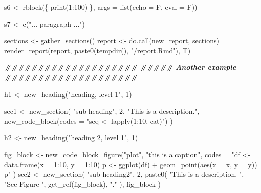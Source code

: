 \documentclass[
]{article}
\newenvironment{Shaded}{\begin{snugshade}}{\end{snugshade}}
\newcommand{\AttributeTok}[1]{\textcolor[rgb]{0.77,0.63,0.00}{#1}}
\newcommand{\DecValTok}[1]{\textcolor[rgb]{0.00,0.00,0.81}{#1}}
\newcommand{\DocumentationTok}[1]{\textcolor[rgb]{0.56,0.35,0.01}{\textbf{\textit{#1}}}}
\newcommand{\FunctionTok}[1]{\textcolor[rgb]{0.00,0.00,0.00}{#1}}
\newcommand{\NormalTok}[1]{#1}
\newcommand{\OtherTok}[1]{\textcolor[rgb]{0.56,0.35,0.01}{#1}}
\newcommand{\SpecialCharTok}[1]{\textcolor[rgb]{0.00,0.00,0.00}{#1}}
\newcommand{\StringTok}[1]{\textcolor[rgb]{0.31,0.60,0.02}{#1}}
\begin{document}
\begin{Shaded}
\begin{Highlighting}[]
\NormalTok{s6 }\OtherTok{\textless{}{-}} \FunctionTok{rblock}\NormalTok{(\{}
  \FunctionTok{print}\NormalTok{(}\DecValTok{1}\SpecialCharTok{:}\DecValTok{100}\NormalTok{)}
\NormalTok{\}, }\AttributeTok{args =} \FunctionTok{list}\NormalTok{(}\AttributeTok{echo =}\NormalTok{ F, }\AttributeTok{eval =}\NormalTok{ F))}

\NormalTok{s7 }\OtherTok{\textless{}{-}} \FunctionTok{c}\NormalTok{(}\StringTok{"... paragraph ..."}\NormalTok{)}

\NormalTok{sections }\OtherTok{\textless{}{-}} \FunctionTok{gather\_sections}\NormalTok{()}
\NormalTok{report }\OtherTok{\textless{}{-}} \FunctionTok{do.call}\NormalTok{(new\_report, sections)}
\FunctionTok{render\_report}\NormalTok{(report, }\FunctionTok{paste0}\NormalTok{(}\FunctionTok{tempdir}\NormalTok{(), }\StringTok{"/report.Rmd"}\NormalTok{), T)}

\DocumentationTok{\#\#\#\#\#\#\#\#\#\#\#\#\#\#\#\#\#\#\#\#}
\DocumentationTok{\#\#\#\#\# Another example}
\DocumentationTok{\#\#\#\#\#\#\#\#\#\#\#\#\#\#\#\#\#\#\#\#}

\NormalTok{h1 }\OtherTok{\textless{}{-}} \FunctionTok{new\_heading}\NormalTok{(}\StringTok{"heading, level 1"}\NormalTok{, }\DecValTok{1}\NormalTok{)}

\NormalTok{sec1 }\OtherTok{\textless{}{-}} \FunctionTok{new\_section}\NormalTok{(}
  \StringTok{"sub{-}heading"}\NormalTok{, }\DecValTok{2}\NormalTok{,}
  \StringTok{"This is a description."}\NormalTok{,}
  \FunctionTok{new\_code\_block}\NormalTok{(}\AttributeTok{codes =} \StringTok{"seq \textless{}{-} lapply(1:10, cat)"}\NormalTok{)}
\NormalTok{)}

\NormalTok{h2 }\OtherTok{\textless{}{-}} \FunctionTok{new\_heading}\NormalTok{(}\StringTok{"heading 2, level 1"}\NormalTok{, }\DecValTok{1}\NormalTok{)}

\NormalTok{fig\_block }\OtherTok{\textless{}{-}} \FunctionTok{new\_code\_block\_figure}\NormalTok{(}\StringTok{"plot"}\NormalTok{, }\StringTok{"this is a caption"}\NormalTok{,}
  \AttributeTok{codes =} \StringTok{"df \textless{}{-} data.frame(x = 1:10, y = 1:10)}
\StringTok{    p \textless{}{-} ggplot(df) +}
\StringTok{      geom\_point(aes(x = x, y = y))}
\StringTok{    p"}
\NormalTok{)}
\NormalTok{sec2 }\OtherTok{\textless{}{-}} \FunctionTok{new\_section}\NormalTok{(}
  \StringTok{"sub{-}heading2"}\NormalTok{, }\DecValTok{2}\NormalTok{,}
  \FunctionTok{paste0}\NormalTok{(}
    \StringTok{"This is a description. "}\NormalTok{,}
    \StringTok{"See Figure "}\NormalTok{, }\FunctionTok{get\_ref}\NormalTok{(fig\_block), }\StringTok{"."}
\NormalTok{  ),}
\NormalTok{  fig\_block}
\NormalTok{)}


\end{Highlighting}
\end{Shaded}
\end{document}
